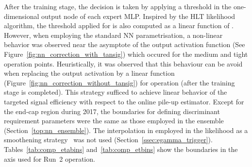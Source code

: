After the training stage, the decision is taken by applying a threshold in the
one-dimensional output node of each expert MLP.\@ 
Inspired by the HLT likelihood algorithm, the threshold applied for
\rnn is also computed as a linear function of \avgmu{}.
However, when employing the standard NN parametrisation, a non-linear
behavior was observed near the asymptote of the output activation 
function (See Figure~\ref{fig:nn_correction_with_tansig}) which occured
for the medium and tight operation points. Heuristically, it was 
observed that this behaviour can be avoid when replacing the output
activation by a linear function (Figure~\ref{fig:nn_correction_without_tansig})
for operation (after the training stage is completed).
This strategy sufficed to achieve linear
behavior of the targeted signal efficiency with respect to the online pile-up
estimator. Except for the end-cap region during 2017, the boundaries for
defining discriminant requirement parameters were the same as those employed in
the \rnn ensemble (Section~\ref{top:nn_ensemble}). The interpolation in
\et{} employed in the likelihood as a smoothening
strategy~\cite{aaboud2019electron} was not used
(Section~\ref{ssec:egamma_trigger}).  Tables~\ref{tab:comp_etabins}
and~\ref{tab:comp_etbins} show the boundaries in the \eteta{} axis used for
Run~2 operation.



